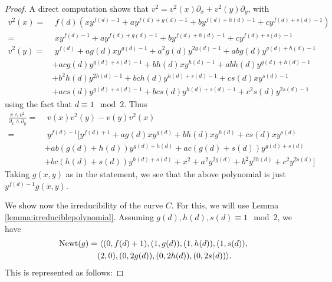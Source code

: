 \documentclass[reqno,oneside,11pt]{amsart}
\theoremstyle{definition}
\begin{document}
\begin{proof}
    A direct computation shows that $v^2 = v^2(x)\partial_x + v^2(y)\partial_y$, with
    \begin{align*}
        v^2(x) = &\,\, f(d)(xy^{f(d)-1}+ay^{f(d)+g(d)-1}+by^{f(d)+h(d)-1}+cy^{f(d)+s(d)-1})\\
        = & \,\, xy^{f(d)-1}+ay^{f(d)+g(d)-1}+by^{f(d)+h(d)-1}+cy^{f(d)+s(d)-1} \\
        v^2(y) = & \,\, y^{f(d)} + ag(d)xy^{g(d)-1} + a^2g(d)y^{2g(d)-1}+abg(d)y^{g(d)+h(d)-1}\\ & + acg(d)y^{g(d)+s(d)-1}
        + bh(d)xy^{h(d)-1} + abh(d)y^{g(d)+h(d)-1} \\ & +b^2h(d)y^{2h(d)-1}+bch(d)y^{h(d)+s(d)-1}
         + cs(d)xy^{s(d)-1}\\ &+ acs(d)y^{g(d)+s(d)-1}+bcs(d)y^{h(d)+s(d)-1}+c^2s(d)y^{2s(d)-1}
    \end{align*}
using the fact that $d \equiv 1 \mod 2$.
    Thus 
    \begin{align*}
    \frac{v \wedge v^2}{\partial_x \wedge \partial_y} = &\,\,  v(x)v^2(y) - v(y)v^2(x) \\
                = & \,\, y^{f(d) - 1}[y^{f(d)+1}+ ag(d)xy^{g(d)} + bh(d)xy^{h(d)}+ cs(d)xy^{s(d)} \\
                & + ab(g(d)+h(d))y^{g(d)+h(d)} + ac(g(d)+s(d))y^{g(d)+s(d)} \\
                & + bc(h(d)+s(d))y^{h(d)+s(d)} + x^2 + a^2y^{2g(d)} + b^2y^{2h(d)}+c^2y^{2s(d)}]
    \end{align*}
    Taking $g(x,y)$ as in the statement, we see that the above polynomial is just $y^{f(d)-1}g(x,y)$.

    We show now the irreducibility of the curve $C$. For this, we will use Lemma \ref{lemma:irreduciblepolynomial}. Assuming $g(d),h(d),s(d) \equiv 1 \mod 2$, we have 
    \begin{align*}
        {\rm Newt}(g)  =& \,\, \langle (0,f(d)+1), (1,g(d)), (1,h(d)), (1,s(d)), \\
        & (2,0), (0,2g(d)), (0,2h(d)), (0,2s(d)) \rangle .
    \end{align*}
    This is represented as follows:

\end{proof}
\end{document}
